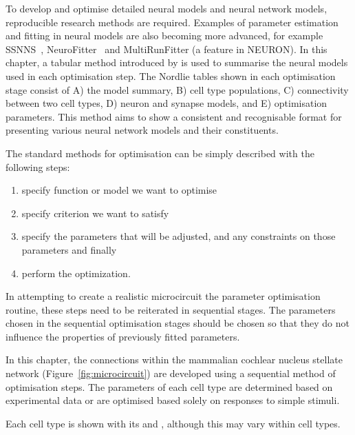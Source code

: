 To develop and optimise detailed neural models and neural network models,
reproducible research methods are required.  Examples of parameter estimation
and fitting in neural models are also becoming more advanced, for example
SSNNS~\citep{SichtigSchafferEtAl:2008}, NeuroFitter
\citep{VanAchardEtAl:2007}~and MultiRunFitter (a feature in NEURON).  In this
chapter, a tabular method introduced by \citet{NordlieGewaltigEtAl:2009} is used
to summarise the neural models used in each optimisation step.  The Nordlie
tables shown in each optimisation stage consist of A) the model summary, B) cell
type populations, C) connectivity between two cell types, D) neuron and synapse
models, and E) optimisation parameters.  This method aims to show a consistent
and recognisable format for presenting various neural network models and their
constituents.


The standard methods for optimisation can be simply described with the following
steps: \begin{enumerate}
\item specify function or model we want to optimise
\item specify criterion we want to satisfy
\item specify the parameters that will be adjusted, and any constraints on those
  parameters and finally
\item perform the optimization.
\end{enumerate}

In attempting to create a realistic microcircuit the parameter optimisation
routine, these steps need to be reiterated in sequential stages.  The parameters
chosen in the sequential optimisation stages should be chosen so that they do
not influence the properties of previously fitted parameters.


In this chapter, the connections within the mammalian cochlear nucleus stellate
network (Figure~\ref{fig:microcircuit}) are developed using a sequential method
of optimisation steps.  The parameters of each cell type are determined based on
experimental data or are optimised based solely on responses to simple stimuli.


Each cell type is shown with its \EIRA and \PSTH, although this may vary within cell types.

